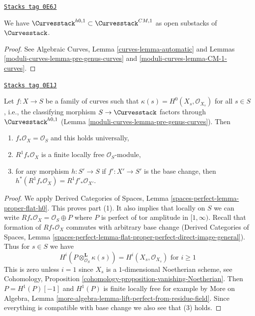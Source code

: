 \begin{lemma}
\label{moduli-curves-lemma-pre-genus-in-CM-1}
\href{https://stacks.math.columbia.edu/tag/0E6J}{\texttt{Stacks tag 0E6J}}

We have $\Curvesstack^{h0, 1} \subset \Curvesstack^{CM, 1}$
as open substacks of $\Curvesstack$.
\end{lemma}

\begin{proof}
See Algebraic Curves, Lemma \ref{curves-lemma-automatic} and
Lemmas \ref{moduli-curves-lemma-pre-genus-curves} and \ref{moduli-curves-lemma-CM-1-curves}.
\end{proof}

\begin{lemma}[Genus]
\label{moduli-curves-lemma-genus}
\href{https://stacks.math.columbia.edu/tag/0E1J}{\texttt{Stacks tag 0E1J}}

Let $f : X \to S$ be a family of curves such that
$\kappa(s) = H^0(X_s, \mathcal{O}_{X_s})$ for all $s \in S$, i.e.,
the classifying morphism $S \to \Curvesstack$ factors
through $\Curvesstack^{h0, 1}$ (Lemma \ref{moduli-curves-lemma-pre-genus-curves}). Then
\begin{enumerate}
\item $f_*\mathcal{O}_X = \mathcal{O}_S$ and this holds universally,
\item $R^1f_*\mathcal{O}_X$ is a finite locally free $\mathcal{O}_S$-module,
\item for any morphism $h : S' \to S$ if $f' : X' \to S'$ is the base change,
then $h^*(R^1f_*\mathcal{O}_X) = R^1f'_*\mathcal{O}_{X'}$.
\end{enumerate}
\end{lemma}

\begin{proof}
We apply Derived Categories of Spaces, Lemma
\ref{spaces-perfect-lemma-proper-flat-h0}.
This proves part (1). It also implies that locally on $S$
we can write $Rf_*\mathcal{O}_X = \mathcal{O}_S \oplus P$
where $P$ is perfect of tor amplitude in $[1, \infty)$.
Recall that formation of $Rf_*\mathcal{O}_X$ commutes
with arbitrary base change
(Derived Categories of Spaces, Lemma
\ref{spaces-perfect-lemma-flat-proper-perfect-direct-image-general}).
Thus for $s \in S$ we have
$$
H^i(P \otimes_{\mathcal{O}_S}^\mathbf{L} \kappa(s)) =
H^i(X_s, \mathcal{O}_{X_s})
\text{ for }i \geq 1
$$
This is zero unless $i = 1$ since $X_s$ is a $1$-dimensional
Noetherian scheme, see
Cohomology, Proposition \ref{cohomology-proposition-vanishing-Noetherian}.
Then $P = H^1(P)[-1]$ and $H^1(P)$ is finite locally free
for example by More on Algebra, Lemma
\ref{more-algebra-lemma-lift-perfect-from-residue-field}.
Since everything is compatible with base change we
also see that (3) holds.
\end{proof}

